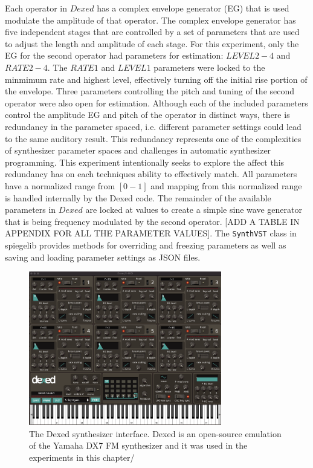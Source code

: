 Each operator in $Dexed$ has a complex envelope generator (EG) that is used modulate the amplitude of that operator. The complex envelope generator has five independent stages that are controlled by a set of parameters that are used to adjust the length and amplitude of each stage. For this experiment, only the EG for the second operator had parameters for estimation: $LEVEL 2-4$ and $RATE 2-4$. The $RATE 1$ and $LEVEL 1$ parameters were locked to the minmimum rate and highest level, effectively turning off the initial rise portion of the envelope. Three parameters controlling the pitch and tuning of the second operator were also open for estimation. Although each of the included parameters control the amplitude EG and pitch of the operator in distinct ways, there is redundancy in the parameter spaced, i.e. different parameter settings could lead to the same auditory result. This redundancy represents one of the complexities of synthesizer parameter spaces and challenges in automatic synthesizer programming. This experiment intentionally seeks to explore the affect this redundancy has on each techniques ability to effectively match. All parameters have a normalized range from $[0-1]$ and mapping from this normalized range is handled internally by the Dexed code. The remainder of the available parameters in $Dexed$ are locked at values to create a simple sine wave generator that is being frequency modulated by the second operator. [ADD A TABLE IN APPENDIX FOR ALL THE PARAMETER VALUES]. The \texttt{SynthVST} class in spiegelib provides methods for overriding and freezing parameters as well as saving and loading parameter settings as JSON files. 

\begin{figure}[ht]
    \centering
    \includegraphics[width=0.75\textwidth]{figures/spiegelib/dexed.png}
    \caption{The Dexed synthesizer interface. Dexed is an open-source emulation of the Yamaha DX7 FM synthesizer and it was used in the experiments in this chapter/}
    \label{fig:dexed}
\end{figure}

